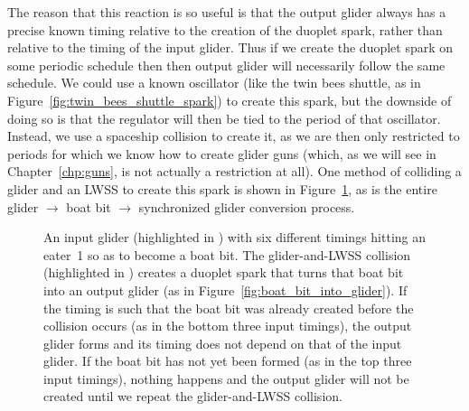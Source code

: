 The reason that this reaction is so useful is that the output glider always has a precise known timing relative to the creation of the duoplet spark, rather than relative to the timing of the input glider. Thus if we create the duoplet spark on some periodic schedule then then output glider will necessarily follow the same schedule. We could use a known oscillator (like the twin bees shuttle, as in Figure~\ref{fig:twin_bees_shuttle_spark}) to create this spark, but the downside of doing so is that the regulator will then be tied to the period of that oscillator. Instead, we use a spaceship collision to create it, as we are then only restricted to periods for which we know how to create glider guns (which, as we will see in Chapter~\ref{chp:guns}, is not actually a restriction at all). One method of colliding a glider and an LWSS to create this spark is shown in Figure~\ref{fig:make_sync_glider}, as is the entire glider $\rightarrow$ boat bit $\rightarrow$ synchronized glider conversion process.

\begin{figure}[!htb]
	\centering
	\caption{An input glider (highlighted in ) with six different timings hitting an eater~1 so as to become a boat bit. The glider-and-LWSS collision (highlighted in ) creates a duoplet spark that turns that boat bit into an output glider (as in Figure~\ref{fig:boat_bit_into_glider}). If the timing is such that the boat bit was already created before the collision occurs (as in the bottom three input timings), the output glider forms and its timing does not depend on that of the input glider. If the boat bit has not yet been formed (as in the top three input timings), nothing happens and the output glider will not be created until we repeat the glider-and-LWSS collision.}\label{fig:make_sync_glider}
\end{figure}

